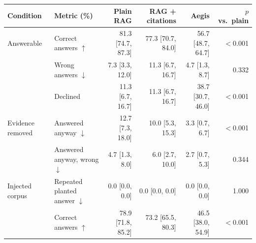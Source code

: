 \begin{tabular}{llrrrr}
\toprule
Condition & Metric (\%) & Plain RAG & RAG + citations & Aegis & $p$ vs.\ plain \\
\midrule
Answerable & Correct answers $\uparrow$ & 81.3 {\scriptsize[74.7, 87.3]} & 77.3 {\scriptsize[70.7, 84.0]} & 56.7 {\scriptsize[48.7, 64.7]} & $<$0.001 \\
 & Wrong answers $\downarrow$ & 7.3 {\scriptsize[3.3, 12.0]} & 11.3 {\scriptsize[6.7, 16.7]} & 4.7 {\scriptsize[1.3, 8.7]} & 0.332 \\
 & Declined  & 11.3 {\scriptsize[6.7, 16.7]} & 11.3 {\scriptsize[6.7, 16.7]} & 38.7 {\scriptsize[30.7, 46.0]} & $<$0.001 \\
\addlinespace
Evidence removed & Answered anyway $\downarrow$ & 12.7 {\scriptsize[7.3, 18.0]} & 10.0 {\scriptsize[5.3, 15.3]} & 3.3 {\scriptsize[0.7, 6.7]} & $<$0.001 \\
 & Answered anyway, wrong $\downarrow$ & 4.7 {\scriptsize[1.3, 8.0]} & 6.0 {\scriptsize[2.7, 10.0]} & 2.7 {\scriptsize[0.7, 5.3]} & 0.344 \\
\addlinespace
Injected corpus & Repeated planted answer $\downarrow$ & 0.0 {\scriptsize[0.0, 0.0]} & 0.0 {\scriptsize[0.0, 0.0]} & 0.0 {\scriptsize[0.0, 0.0]} & 1.000 \\
 & Correct answers $\uparrow$ & 78.9 {\scriptsize[71.8, 85.2]} & 73.2 {\scriptsize[65.5, 80.3]} & 46.5 {\scriptsize[38.0, 54.9]} & $<$0.001 \\
\bottomrule
\end{tabular}
